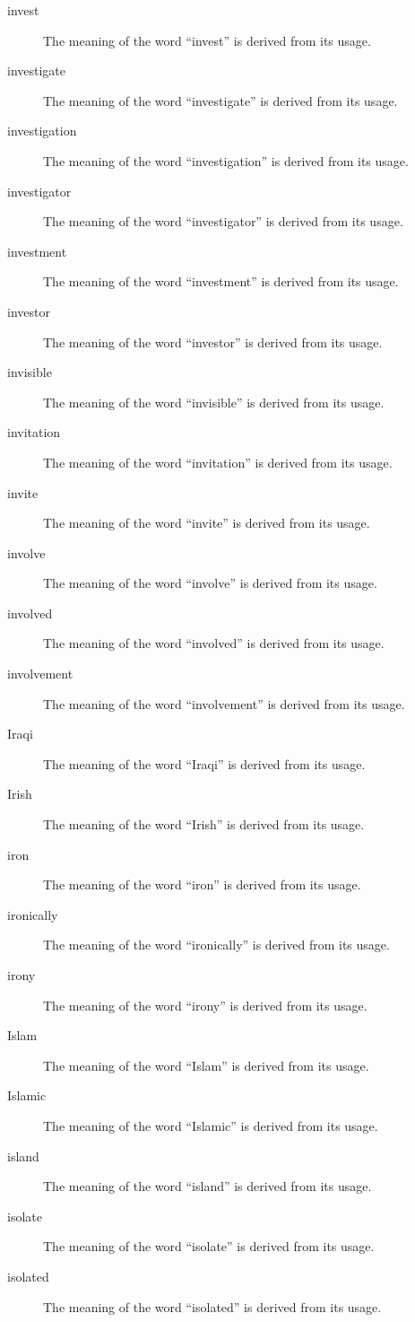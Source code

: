 \documentclass[12pt, letterpaper]{memoir}
\begin{document}
\begin{description}
\item[invest] The meaning of the word ``invest'' is derived from its usage.
\item[investigate] The meaning of the word ``investigate'' is derived from its usage.
\item[investigation] The meaning of the word ``investigation'' is derived from its usage.
\item[investigator] The meaning of the word ``investigator'' is derived from its usage.
\item[investment] The meaning of the word ``investment'' is derived from its usage.
\item[investor] The meaning of the word ``investor'' is derived from its usage.
\item[invisible] The meaning of the word ``invisible'' is derived from its usage.
\item[invitation] The meaning of the word ``invitation'' is derived from its usage.
\item[invite] The meaning of the word ``invite'' is derived from its usage.
\item[involve] The meaning of the word ``involve'' is derived from its usage.
\item[involved] The meaning of the word ``involved'' is derived from its usage.
\item[involvement] The meaning of the word ``involvement'' is derived from its usage.
\item[Iraqi] The meaning of the word ``Iraqi'' is derived from its usage.
\item[Irish] The meaning of the word ``Irish'' is derived from its usage.
\item[iron] The meaning of the word ``iron'' is derived from its usage.
\item[ironically] The meaning of the word ``ironically'' is derived from its usage.
\item[irony] The meaning of the word ``irony'' is derived from its usage.
\item[Islam] The meaning of the word ``Islam'' is derived from its usage.
\item[Islamic] The meaning of the word ``Islamic'' is derived from its usage.
\item[island] The meaning of the word ``island'' is derived from its usage.
\item[isolate] The meaning of the word ``isolate'' is derived from its usage.
\item[isolated] The meaning of the word ``isolated'' is derived from its usage.

\end{description}
\end{document}
